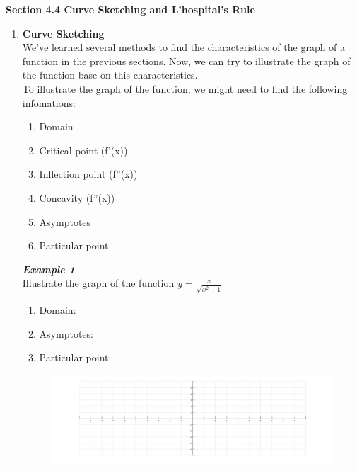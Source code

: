 \documentclass[12px]{article}
\begin{document}
\begin{center}
    \Large\textbf{Section 4.4 Curve Sketching and L'hospital's Rule}
\end{center}
\begin{enumerate}
    \item \textbf{Curve Sketching}\\
    \hspace*{2em}We've learned several methods to find the characteristics of the graph of a function in the previous sections. Now, we can try to illustrate the graph of the function base on this characteristics.\\
    \hspace*{2em}To illustrate the graph of the function, we might need to find the following infomations:
    \begin{multicols}{2}
        \begin{enumerate}[(1)]
            \item Domain
            \item Critical point (f'(x))
            \item Inflection point (f''(x))
            \item Concavity (f''(x))
            \item Asymptotes
            \item Particular point
        \end{enumerate}
    \end{multicols}
    \textbf{\textit{Example 1}}\\
    Illustrate the graph of the function $y=\frac{x}{\sqrt{x^2-1}}$
    \begin{enumerate}[(1)]
        \item Domain:
        \item Asymptotes:
        \item Particular point:
    \end{enumerate}
    \begin{figure}[h]
        \centering
        \includegraphics*[width=20cm]{grid.jpg}
    \end{figure}

\end{enumerate}
\end{document}
